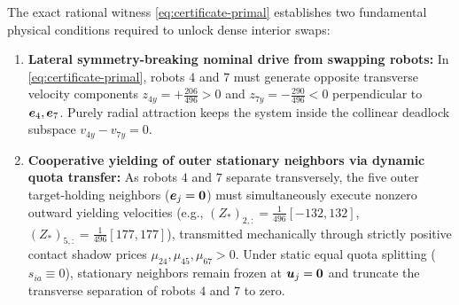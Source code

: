 \begin{remark}\label{rem:two-conditions}
The exact rational witness \eqref{eq:certificate-primal} establishes two fundamental physical conditions required to unlock dense interior swaps:
\begin{enumerate}
 \item \textbf{Lateral symmetry-breaking nominal drive from swapping robots:} In \eqref{eq:certificate-primal}, robots $4$ and $7$ must generate opposite transverse velocity components $z_{4y}=+\frac{206}{496}>0$ and $z_{7y}=-\frac{290}{496}<0$ perpendicular to $\boldsymbol{e}_4,\boldsymbol{e}_7$. Purely radial attraction keeps the system inside the collinear deadlock subspace $v_{4y}-v_{7y}=0$.
 \item \textbf{Cooperative yielding of outer stationary neighbors via dynamic quota transfer:} As robots $4$ and $7$ separate transversely, the five outer target-holding neighbors ($\boldsymbol{e}_j=\boldsymbol 0$) must simultaneously execute nonzero outward yielding velocities (e.g., $(Z_*)_{2,:}=\frac1{496}[-132,132]$, $(Z_*)_{5,:}=\frac1{496}[177,177]$), transmitted mechanically through strictly positive contact shadow prices $\mu_{24},\mu_{45},\mu_{67}>0$. Under static equal quota splitting ($s_{ia}\equiv 0$), stationary neighbors remain frozen at $\boldsymbol{u}_j=\boldsymbol 0$ and truncate the transverse separation of robots $4$ and $7$ to zero.
\end{enumerate}
\end{remark}
